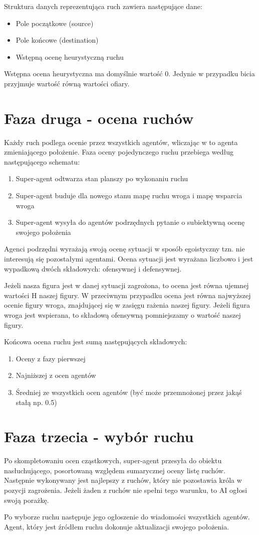 \documentclass[a4paper,12pt,oneside,notitlepage,onecolumn]{article}
\begin{document}
Struktura danych reprezentująca ruch zawiera następujące dane:
\begin{itemize}
 \item Pole początkowe (source)
 \item Pole końcowe (destination)
 \item Wstępną ocenę heurystyczną ruchu
\end{itemize}

Wstępna ocena heurystyczna ma domyślnie wartość 0.
Jedynie w przypadku bicia przyjmuje wartość równą wartości ofiary.

\section{Faza druga - ocena ruchów}
Każdy ruch podlega ocenie przez wszystkich agentów, wliczając w to agenta zmieniającego położenie.
Faza oceny pojedynczego ruchu przebiega według następującego schematu:
\begin{enumerate}
 \item Super-agent odtwarza stan planszy po wykonaniu ruchu
 \item Super-agent buduje dla nowego stanu mapę ruchu wroga i mapę wsparcia wroga
 \item Super-agent wysyła do agentów podrzędnych pytanie o subiektywną ocenę swojego położenia
\end{enumerate}

Agenci podrzędni wyrażają swoją ocenę sytuacji w sposób egoistyczny tzn. nie interesują się pozostałymi agentami.
Ocena sytuacji jest wyrażana liczbowo i jest wypadkową dwóch składowych: ofensywnej i defensywnej.

Jeżeli nasza figura jest w danej sytuacji zagrożona, to ocena jest równa ujemnej wartości H naszej figury.
W przeciwnym przypadku ocena jest równa najwyższej ocenie figury wroga, znajdującej się w zasięgu rażenia naszej figury.
Jeżeli figura wroga jest wspierana, to składową ofensywną pomniejszamy o wartość naszej figury.

Końcowa ocena ruchu jest sumą następujących składowych:
\begin{enumerate}
 \item Oceny z fazy pierwszej
 \item Najniższej z ocen agentów
 \item Średniej ze wszystkich ocen agentów (być może przemnożonej przez jakąś stałą np. 0.5)
\end{enumerate}

\section{Faza trzecia - wybór ruchu}
Po skompletowaniu ocen cząstkowych, super-agent przesyła do obiektu nasłuchującego, posortowaną względem sumarycznej oceny listę ruchów.
Następnie wykonywany jest najlepszy z ruchów, który nie pozostawia króla w pozycji zagrożenia.
Jeżeli żaden z ruchów nie spełni tego warunku, to AI ogłosi swoją porażkę.

Po wyborze ruchu następuje jego ogłoszenie do wiadomości wszystkich agentów.
Agent, który jest źródłem ruchu dokonuje aktualizacji swojego położenia.
\end{document}
